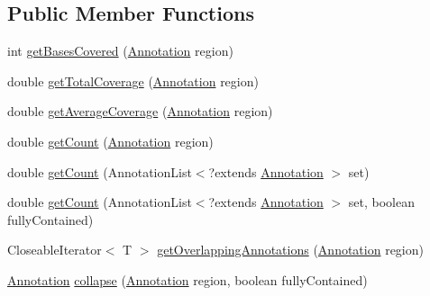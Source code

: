 \subsection*{Public Member Functions}
\begin{DoxyCompactItemize}
\item 
int \hyperlink{classumms_1_1core_1_1annotation_1_1_abstract_annotation_collection_3_01_t_01extends_01_annotation_01_4_a752a3547528015029ac6526b47e455f1}{get\+Bases\+Covered} (\hyperlink{interfaceumms_1_1core_1_1annotation_1_1_annotation}{Annotation} region)
\item 
double \hyperlink{classumms_1_1core_1_1annotation_1_1_abstract_annotation_collection_3_01_t_01extends_01_annotation_01_4_a6e0d575c3f9629a083419111507dc33a}{get\+Total\+Coverage} (\hyperlink{interfaceumms_1_1core_1_1annotation_1_1_annotation}{Annotation} region)
\item 
double \hyperlink{classumms_1_1core_1_1annotation_1_1_abstract_annotation_collection_3_01_t_01extends_01_annotation_01_4_af4195a976a2cfe99cf89cb79a3175b9d}{get\+Average\+Coverage} (\hyperlink{interfaceumms_1_1core_1_1annotation_1_1_annotation}{Annotation} region)
\item 
double \hyperlink{classumms_1_1core_1_1annotation_1_1_abstract_annotation_collection_3_01_t_01extends_01_annotation_01_4_a260b940b8bbebeb3e04bd0e75b003d17}{get\+Count} (\hyperlink{interfaceumms_1_1core_1_1annotation_1_1_annotation}{Annotation} region)
\item 
double \hyperlink{classumms_1_1core_1_1annotation_1_1_abstract_annotation_collection_3_01_t_01extends_01_annotation_01_4_a138d022524b7000f40e5c775b4a1bab0}{get\+Count} (Annotation\+List$<$?extends \hyperlink{interfaceumms_1_1core_1_1annotation_1_1_annotation}{Annotation} $>$ set)
\item 
double \hyperlink{classumms_1_1core_1_1annotation_1_1_abstract_annotation_collection_3_01_t_01extends_01_annotation_01_4_acaf23203075e8178235da7742eee40c5}{get\+Count} (Annotation\+List$<$?extends \hyperlink{interfaceumms_1_1core_1_1annotation_1_1_annotation}{Annotation} $>$ set, boolean fully\+Contained)
\item 
Closeable\+Iterator$<$ T $>$ \hyperlink{classumms_1_1core_1_1annotation_1_1_abstract_annotation_collection_3_01_t_01extends_01_annotation_01_4_a7e46ae18a43e66b8da2b821853df3fd5}{get\+Overlapping\+Annotations} (\hyperlink{interfaceumms_1_1core_1_1annotation_1_1_annotation}{Annotation} region)
\item 
\hyperlink{interfaceumms_1_1core_1_1annotation_1_1_annotation}{Annotation} \hyperlink{classumms_1_1core_1_1annotation_1_1_abstract_annotation_collection_3_01_t_01extends_01_annotation_01_4_a3a84e443b2bd20e3ac8aa8c4e91eaad3}{collapse} (\hyperlink{interfaceumms_1_1core_1_1annotation_1_1_annotation}{Annotation} region, boolean fully\+Contained)

\end{DoxyCompactItemize}
